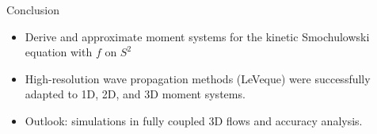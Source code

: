     \begin{frame}{Conclusion}
     \begin{itemize}
     	\item Derive and approximate moment systems for the kinetic Smochulowski equation with $f$ on $S^2$
     	\item High-resolution wave propagation methods (LeVeque) were successfully adapted to 1D, 2D, and 3D moment systems.
     	\item Outlook: simulations in fully coupled 3D flows and accuracy analysis.
     \end{itemize}
    \end{frame}

